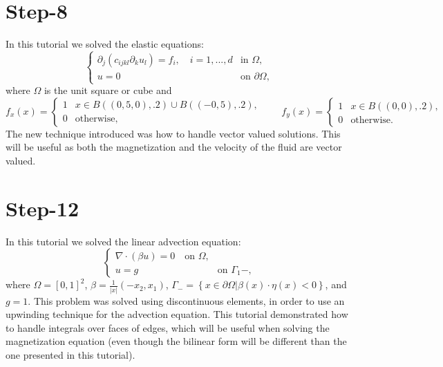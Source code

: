 \documentclass[11pt,fullpage]{article}
\newcommand{\abs}[1]{\left\vert#1\right\vert}
\newcommand{\set}[1]{\left\{#1\right\}}
\newcommand{\grad}{\nabla}
\theoremstyle{lemma}
\theoremstyle{definition}
\theoremstyle{lemma}
\begin{document}
\section*{Step-8}
In this tutorial we solved the elastic equations:
$$
	\begin{cases}
	\partial_j(c_{ijkl}\partial_k u_l) = f_i, \quad i=1,...,d & \text{in }\Omega,\\
	u = 0 & \text{on } \partial \Omega,
	\end{cases}
$$
where $\Omega$ is the unit square or cube and
$$
	f_x(x) = \begin{cases}
	1 & x\in B((0,5,0), .2)\cup B((-0,5),.2),\\
	0 & \text{otherwise},
	\end{cases}\quad\quad
	f_y(x) = \begin{cases}
	1 & x\in B((0,0), .2),\\
	0 & \text{otherwise}.
	\end{cases}
$$
The new technique introduced was how to handle vector valued solutions. This will be useful as both the magnetization and the velocity of the fluid are vector valued.

\section*{Step-12}
In this tutorial we solved the linear advection equation:
$$
	\begin{cases}
	\grad\cdot(\beta u) = 0 \quad \text{on }\Omega,\\
	u = g & \text{on } \Gamma_1-,
	\end{cases}
$$
where $\Omega = [0,1]^2$, $\beta = \frac{1}{\abs{x}}(-x_2,x_1)$, $\Gamma_- = \set{x\in\partial\Omega | \beta(x)\cdot \eta(x) < 0}$, and $g=1$. This problem was solved using discontinuous elements, in order to use an upwinding technique for the advection equation. This tutorial demonstrated how to handle integrals over faces of edges, which will be useful when solving the magnetization equation (even though the bilinear form will be different than the one presented in this tutorial).
\end{document}
